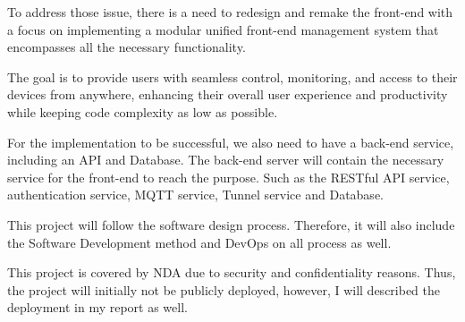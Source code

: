 
To address those issue, there is a need to redesign and remake the front-end with
a focus on implementing a modular unified front-end management system that
encompasses all the necessary functionality. 

The goal is to provide users with seamless control, monitoring, and access to their devices from anywhere, 
enhancing their overall user experience and productivity while keeping code complexity as low as possible.

For the implementation to be successful, we also need to have a back-end
service, including an API and Database. The back-end server will contain the
necessary service for the front-end to reach the purpose. Such as the RESTful
API service, authentication service, MQTT service, Tunnel service and Database.

This project will follow the software design process. Therefore, it will also include
the Software Development method and DevOps on all process as well. 

This project is covered by NDA due to security and confidentiality reasons. Thus, the
project will initially not be publicly deployed, however, I will described the
deployment in my report as well.






